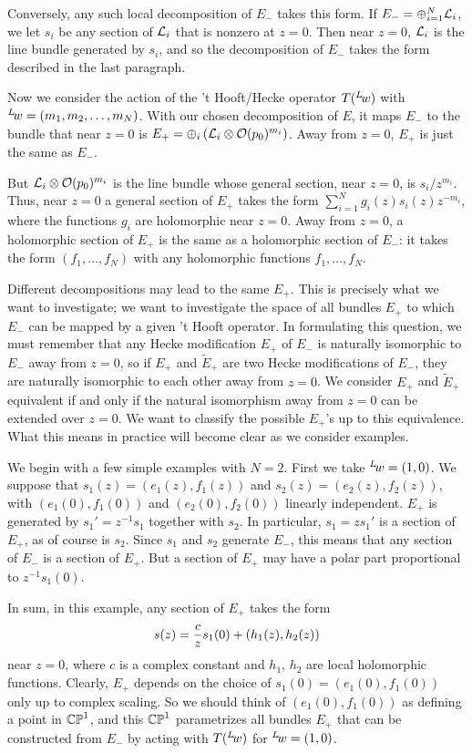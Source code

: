 Conversely, any such local decomposition of $E_-$ takes this form.
If $E_-=\oplus_{i=1}^N{\cal L}_i$, we let $s_i$ be any section of
${\cal L}_i$ that is nonzero at $z=0$.  Then near $z=0$, ${\cal
L}_i$ is the line bundle generated by $s_i$, and so the
decomposition of $E_-$ takes the form described in the last
paragraph.

Now we consider the action of the 't Hooft/Hecke operator
$T(^L\negthinspace w)$ with $^L\negthinspace w=(m_1,m_2,\dots,
m_N)$.  With our chosen decomposition of $E$, it maps $E_-$ to the
bundle that near $z=0$ is $E_+=\oplus_i\left( {\cal L}_i\otimes
{\cal O}(p_0)^{m_i}\right)$. Away from $z=0$, $E_+$ is just the
same as $E_-$.

But ${\cal L}_i\otimes {\cal O}(p_0)^{m_i}$ is the line bundle
whose general section, near $z=0$, is $s_i/z^{m_i}$. Thus, near
$z=0$ a general section of $E_+$ takes the form $\sum_{i=1}^N
g_i(z) s_i(z)z^{-m_i}$, where the functions $g_i$ are holomorphic
near $z=0$.  Away from $z=0$, a holomorphic section of $E_+$ is
the same as a holomorphic section of $E_-$: it takes the form
$(f_1,\dots,f_N)$ with any holomorphic functions $f_1,\dots,f_N$.

Different decompositions may lead to the same $E_+$. This is
precisely what we want to investigate; we want to investigate the
space of all bundles $E_+$ to which $E_-$ can be mapped by a given
't Hooft operator.  In formulating this question, we must remember
that any Hecke modification $E_+$ of $E_-$ is naturally isomorphic
to $E_-$ away from $z=0$, so if $E_+$ and $\tilde E_+$ are two
Hecke modifications of $E_-$, they are naturally isomorphic to
each other away from $z=0$.  We consider $E_+$ and $\tilde E_+$
equivalent if and only if the natural isomorphism away from $z=0 $
can be extended over $z=0$.  We want to classify the possible
$E_+$'s up to this equivalence.  What this means in practice will
become clear as we consider examples.

We begin with a few simple examples with $N=2$. First we take
$^L\negthinspace w=(1,0)$. We suppose that
$s_1(z)=(e_1(z),f_1(z))$ and $s_2(z)=(e_2(z),f_2(z))$, with
$(e_1(0),f_1(0))$ and $(e_2(0),f_2(0))$ linearly independent.
$E_+$ is generated by $s_1'=z^{-1}s_1$ together with $s_2$.  In
particular, $s_1=zs_1'$ is a section of $E_+$, as of course is
$s_2$.  Since $s_1$ and $s_2$ generate $E_-$, this means that any
section of $E_-$ is a section of $E_+$.  But a section of $E_+$
may have a polar part proportional to $z^{-1}s_1(0)$.

In sum, in this example, any section of $E_+$ takes the form
\setcounter{equation}{15}
\begin{equation}\label{eq:milok}
s(z)={c\over z}s_1(0)+(h_1(z),h_2(z))
\end{equation}
 near $z=0$,
where $c$ is a complex constant and $h_1$, $h_2$ are local
holomorphic functions. Clearly, $E_+$ depends on the choice of
$s_1(0)=(e_1(0),f_1(0))$ only up to complex scaling.  So we should
think of $(e_1(0),f_1(0))$ as defining a point in $\Bbb{CP}^1$,
and this $\Bbb{CP}^1$ parametrizes all bundles $E_+$ that can be
constructed from $E_-$ by acting with $T(^L\negthinspace w)$ for
$^L\negthinspace w=(1,0)$.

